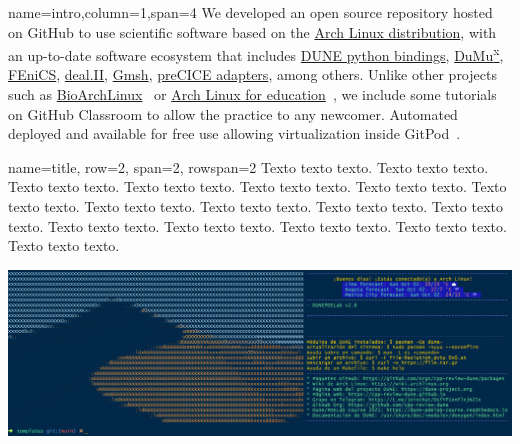 \documentclass[
	paper=a0,%
	style=ruled, %
	]{bfhsciposter}
\newcommand{\tbs}{\textbackslash}
\let\code\texttt
\newcommand*{\macro}[1]{\code{\tbs#1}}
\let\pck\textsf
\let\cls\textsf
\begin{document}
\begin{tcbposter}[
		poster={
				columns=4,
				rows=7,
				spacing=1cm,
			},]

	\begin{posterboxenv}[,BFH-abstract,title=Abstract]{name=intro,column=1,span=4} %
		We developed an open source repository hosted on GitHub to use
		scientific software based on the \href{https://archlinux.org}{Arch Linux distribution},
		with an up-to-date software ecosystem that includes
		\href{https://dune-project.org/doc/gettingstarted}{DUNE python bindings},
		\href{https://dumux.org}{DuMu\textsuperscript{x}},
		\href{https://fenicsproject.org}{FEniCS},
		\href{https://www.dealii.org}{deal.II},
		\href{https://gmsh.info}{Gmsh},
		\href{https://precice.org/adapters-overview.html}{preCICE adapters},
		among others.
		Unlike other projects such as
		\href{https://github.com/BioArchLinux}{BioArchLinux}~\cite{bioarchlinux_2022}
		or \href{https://github.com/arch4edu}{Arch Linux for education}~\cite{arch4edu2019},
		we include some tutorials on GitHub Classroom to allow the practice
		to any newcomer.
		Automated deployed and available for free use allowing virtualization inside
		GitPod~\cite{gitpod_2022}.
	\end{posterboxenv}

	\begin{posterboxenv}[title=C++ Review DUNE]{name=title, row=2, span=2, rowspan=2}
		Texto texto texto. Texto texto texto. Texto texto texto. Texto texto texto. Texto texto texto. Texto texto texto.
		Texto texto texto. Texto texto texto. Texto texto texto. Texto texto texto. Texto texto texto. Texto texto texto.
		Texto texto texto. Texto texto texto. Texto texto texto. Texto texto texto.

		\includegraphics[width=\linewidth]{splash}
	\end{posterboxenv}


\end{tcbposter}
\end{document}
